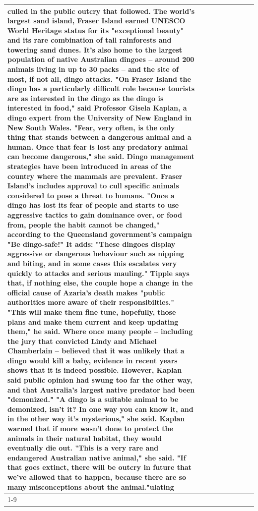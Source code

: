 \begin{table}[H]
\begin{tabular}{lllrlllll}
culled in the public outcry that followed. The world's largest sand island, Fraser Island earned UNESCO World Heritage status for its "exceptional beauty" and its rare combination of tall rainforests and towering sand dunes. It's also home to the largest population of native Australian dingoes -- around 200 animals living in up to 30 packs -- and the site of most, if not all, dingo attacks. "On Fraser Island the dingo has a particularly difficult role because tourists are as interested in the dingo as the dingo is interested in food," said Professor Gisela Kaplan, a dingo expert from the University of New England in New South Wales. "Fear, very often, is the only thing that stands between a dangerous animal and a human. Once that fear is lost any predatory animal can become dangerous," she said. Dingo management strategies have been introduced in areas of the country where the mammals are prevalent. Fraser Island's includes approval to cull specific animals considered to pose a threat to humans. "Once a dingo has lost its fear of people and starts to use aggressive tactics to gain dominance over, or food from, people the habit cannot be changed," according to the Queensland government's campaign "Be dingo-safe!" It adds: "These dingoes display aggressive or dangerous behaviour such as nipping and biting, and in some cases this escalates very quickly to attacks and serious mauling." Tipple says that, if nothing else, the couple hope a change in the official cause of Azaria's death makes "public authorities more aware of their responsibilties." "This will make them fine tune, hopefully, those plans and make them current and keep updating them," he said. Where once many people -- including the jury that convicted Lindy and Michael Chamberlain -- believed that it was unlikely that a dingo would kill a baby, evidence in recent years shows that it is indeed possible. However, Kaplan said public opinion had swung too far the other way, and that Australia's largest native predator had been "demonized." "A dingo is a suitable animal to be demonized, isn't it? In one way you can know it, and in the other way it's mysterious," she said. Kaplan warned that if more wasn't done to protect the animals in their natural habitat, they would eventually die out. "This is a very rare and endangered Australian native animal," she said. "If that goes extinct, there will be outcry in future that we've allowed that to happen, because there are so many misconceptions about the animal."ulating \\
\cline{1-9}

\end{tabular}
\end{table}
